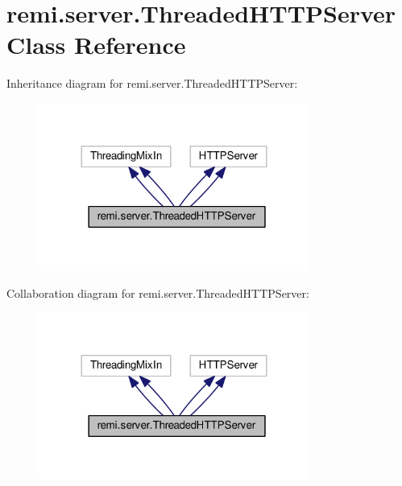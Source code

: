 \hypertarget{classremi_1_1server_1_1ThreadedHTTPServer}{}\section{remi.\+server.\+Threaded\+H\+T\+T\+P\+Server Class Reference}
\label{classremi_1_1server_1_1ThreadedHTTPServer}


Inheritance diagram for remi.\+server.\+Threaded\+H\+T\+T\+P\+Server\+:
\nopagebreak
\begin{figure}[H]
\begin{center}
\leavevmode
\includegraphics[width=252pt]{d6/db2/classremi_1_1server_1_1ThreadedHTTPServer__inherit__graph}
\end{center}
\end{figure}


Collaboration diagram for remi.\+server.\+Threaded\+H\+T\+T\+P\+Server\+:
\nopagebreak
\begin{figure}[H]
\begin{center}
\leavevmode
\includegraphics[width=252pt]{d1/d02/classremi_1_1server_1_1ThreadedHTTPServer__coll__graph}
\end{center}
\end{figure}
